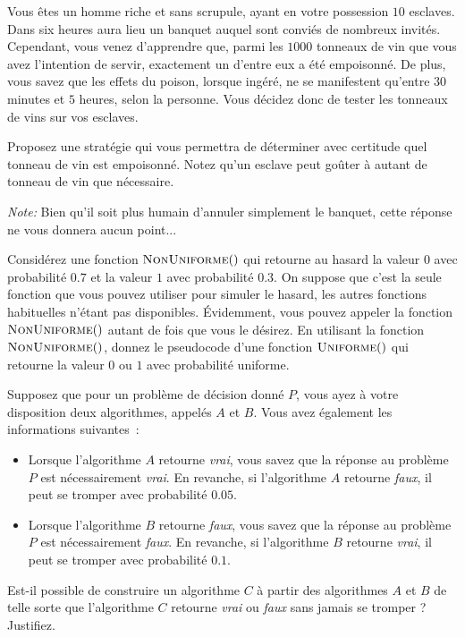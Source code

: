 \documentclass[12pt,addpoints]{exam}
\begin{document}
\begin{questions}
\question
Vous êtes un homme riche et sans scrupule, ayant en votre possession $10$ esclaves. Dans six heures aura lieu un banquet auquel sont conviés de nombreux invités. Cependant, vous venez d'apprendre que, parmi les $1000$ tonneaux de vin que vous avez l'intention de servir, exactement un d'entre eux a été empoisonné. De plus, vous savez que les effets du poison, lorsque ingéré, ne se manifestent qu'entre $30$ minutes et $5$ heures, selon la personne. Vous décidez donc de tester les tonneaux de vins sur vos esclaves.

Proposez une stratégie qui vous permettra de déterminer avec certitude quel tonneau de vin est empoisonné. Notez qu'un esclave peut goûter à autant de tonneau de vin que nécessaire.

\emph{Note:} Bien qu'il soit plus humain d'annuler simplement le banquet, cette réponse ne vous donnera aucun point...


\question
Considérez une fonction $\Call{NonUniforme}$ qui retourne au hasard la valeur $0$ avec probabilité $0.7$ et la valeur $1$ avec probabilité $0.3$. On suppose que c'est la seule fonction que vous pouvez utiliser pour simuler le hasard, les autres fonctions habituelles n'étant pas disponibles. Évidemment, vous pouvez appeler la fonction $\Call{NonUniforme}$ autant de fois que vous le désirez. En utilisant la fonction $\Call{NonUniforme}$, donnez le pseudocode d'une fonction $\Call{Uniforme}$ qui retourne la valeur $0$ ou $1$ avec probabilité uniforme.
\begin{solution}
\end{solution}

\question
Supposez que pour un problème de décision donné $P$, vous ayez à votre disposition deux algorithmes, appelés $A$ et $B$. Vous avez également les informations suivantes~:
\begin{itemize}
  \item Lorsque l'algorithme $A$ retourne \emph{vrai}, vous savez que la réponse au problème $P$ est nécessairement \emph{vrai}. En revanche, si l'algorithme $A$ retourne \emph{faux}, il peut se tromper avec probabilité $0.05$.
  \item Lorsque l'algorithme $B$ retourne \emph{faux}, vous savez que la réponse au problème $P$ est nécessairement \emph{faux}. En revanche, si l'algorithme $B$ retourne \emph{vrai}, il peut se tromper avec probabilité $0.1$.
\end{itemize}
Est-il possible de construire un algorithme $C$ à partir des algorithmes $A$ et $B$ de telle sorte que l'algorithme $C$ retourne \emph{vrai} ou \emph{faux} sans jamais se tromper ? Justifiez.


\end{questions}
\end{document}
